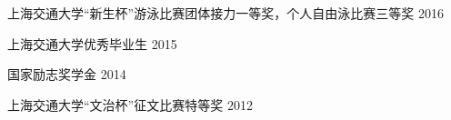 



\begin{cvhonors}

  \cvhonor
    {} %
    {上海交通大学“新生杯”游泳比赛团体接力一等奖，个人自由泳比赛三等奖} %
    {} %
    {2016} %

  \cvhonor
    {} %
    {上海交通大学优秀毕业生} %
    {} %
    {2015} %

  \cvhonor
    {} %
    {国家励志奖学金} %
    {} %
    {2014} %

  \cvhonor
    {} %
    {上海交通大学“文治杯”征文比赛特等奖} %
    {} %
    {2012} %

\end{cvhonors}


%
%
%
%

